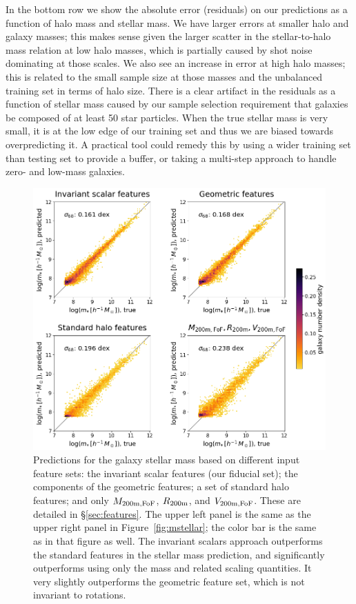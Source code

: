 In the bottom row we show the absolute error (residuals) on our predictions as a function of halo mass and stellar mass.
We have larger errors at smaller halo and galaxy masses; this makes sense given the larger scatter in the stellar-to-halo mass relation at low halo masses, which is partially caused by shot noise dominating at those scales.
We also see an increase in error at high halo masses; this is related to the small sample size at those masses and the unbalanced training set in terms of halo size.
There is a clear artifact in the residuals as a function of stellar mass caused by our sample selection requirement that galaxies be composed of at least 50 star particles.
When the true stellar mass is very small, it is at the low edge of our training set and thus we are biased towards overpredicting it.
A practical tool could remedy this by using a wider training set than testing set to provide a buffer, or taking a multi-step approach to handle zero- and low-mass galaxies.  


\begin{figure}
    \centering
    \includegraphics[width=0.7\columnwidth]{feature_comparison_mstellar.png}
    \caption{Predictions for the galaxy stellar mass based on different input feature sets: the invariant scalar features (our fiducial set); the components of the geometric features; a set of standard halo features; and only $M_\mathrm{200m,FoF}$, $R_\mathrm{200m}$, and $V_\mathrm{200m,FoF}$. These are detailed in \S\ref{sec:features}. The upper left panel is the same as the upper right panel in Figure~\ref{fig:mstellar}; the color bar is the same as in that figure as well. The invariant scalars approach outperforms the standard features in the stellar mass prediction, and significantly outperforms using only the mass and related scaling quantities. It very slightly outperforms the geometric feature set, which is not invariant to rotations.}
    \label{fig:mstellar_compare}
\end{figure}

